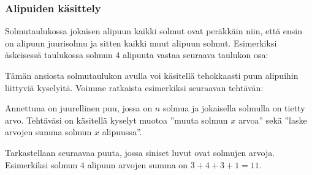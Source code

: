 \subsubsection{Alipuiden käsittely}

Solmutaulukossa jokaisen alipuun kaikki solmut ovat peräkkäin
niin, että ensin on alipuun juurisolmu ja sitten
kaikki muut alipuun solmut.
Esimerkiksi äskeisessä taulukossa solmun $4$
alipuuta vastaa seuraava taulukon osa:

\begin{center}
\end{center}

Tämän ansiosta solmutaulukon avulla voi käsitellä tehokkaasti
puun alipuihin liittyviä kyselyitä.
Voimme ratkaista esimerkiksi seuraavan tehtävän:

\begin{task}
Annettuna on juurellinen puu, jossa on $n$ solmua
ja jokaisella solmulla on tietty arvo.
Tehtäväsi on käsitellä kyselyt muotoa
''muuta solmun $x$ arvoa'' sekä
''laske arvojen summa solmun $x$ alipuussa''.
\end{task}

Tarkastellaan seuraavaa puuta,
jossa siniset luvut ovat solmujen arvoja.
Esimerkiksi solmun $4$ alipuun arvojen summa on $3+4+3+1=11$.

